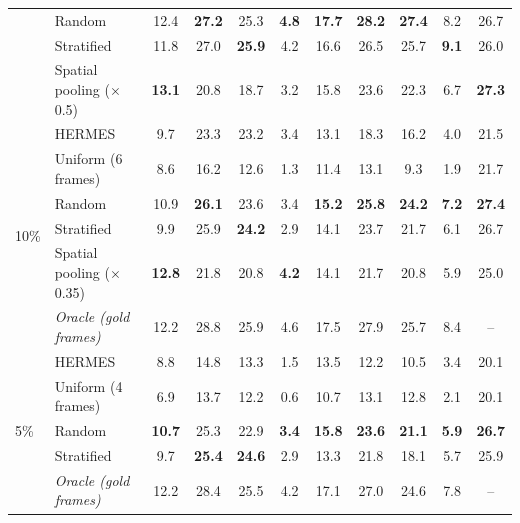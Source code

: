 \begin{table}[t]
\begin{tabular}{llccccccccc}
 & Random & 12.4 & \textbf{27.2} & 25.3 & \textbf{4.8} & \textbf{17.7} & \textbf{28.2} & \textbf{27.4} & 8.2 & 26.7 \\
 & Stratified & 11.8 & 27.0 & \textbf{25.9} & 4.2 & 16.6 & 26.5 & 25.7 & \textbf{9.1} & 26.0 \\
 & Spatial pooling ($\times$0.5) & \textbf{13.1} & 20.8 & 18.7 & 3.2 & 15.8 & 23.6 & 22.3 & 6.7 & \textbf{27.3} \\
\midrule
\multirow{6}{*}{10\%} & HERMES & 9.7 & 23.3 & 23.2 & 3.4 & 13.1 & 18.3 & 16.2 & 4.0 & 21.5 \\
 & Uniform (6 frames) & 8.6 & 16.2 & 12.6 & 1.3 & 11.4 & 13.1 & 9.3 & 1.9 & 21.7 \\
 & Random & 10.9 & \textbf{26.1} & 23.6 & 3.4 & \textbf{15.2} & \textbf{25.8} & \textbf{24.2} & \textbf{7.2} & \textbf{27.4} \\
 & Stratified & 9.9 & 25.9 & \textbf{24.2} & 2.9 & 14.1 & 23.7 & 21.7 & 6.1 & 26.7 \\
 & Spatial pooling ($\times$0.35) & \textbf{12.8} & 21.8 & 20.8 & \textbf{4.2} & 14.1 & 21.7 & 20.8 & 5.9 & 25.0 \\
 & \textit{Oracle (gold frames)} & 12.2 & 28.8 & 25.9 & 4.6 & 17.5 & 27.9 & 25.7 & 8.4 & -- \\
\midrule
\multirow{5}{*}{5\%} & HERMES & 8.8 & 14.8 & 13.3 & 1.5 & 13.5 & 12.2 & 10.5 & 3.4 & 20.1 \\
 & Uniform (4 frames) & 6.9 & 13.7 & 12.2 & 0.6 & 10.7 & 13.1 & 12.8 & 2.1 & 20.1 \\
 & Random & \textbf{10.7} & 25.3 & 22.9 & \textbf{3.4} & \textbf{15.8} & \textbf{23.6} & \textbf{21.1} & \textbf{5.9} & \textbf{26.7} \\
 & Stratified & 9.7 & \textbf{25.4} & \textbf{24.6} & 2.9 & 13.3 & 21.8 & 18.1 & 5.7 & 25.9 \\
 & \textit{Oracle (gold frames)} & 12.2 & 28.4 & 25.5 & 4.2 & 17.1 & 27.0 & 24.6 & 7.8 & -- \\
\bottomrule
\end{tabular}
\end{table}
